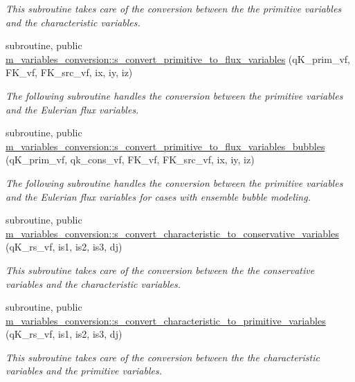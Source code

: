 \begin{DoxyCompactItemize}
\begin{DoxyCompactList}\small\item\em This subroutine takes care of the conversion between the the primitive variables and the characteristic variables. \end{DoxyCompactList}\item 
subroutine, public \hyperlink{namespacem__variables__conversion_a93f1bb8b4aee426f508a6ceef721a35c}{m\+\_\+variables\+\_\+conversion\+::s\+\_\+convert\+\_\+primitive\+\_\+to\+\_\+flux\+\_\+variables} (q\+K\+\_\+prim\+\_\+vf, F\+K\+\_\+vf, F\+K\+\_\+src\+\_\+vf, ix, iy, iz)
\begin{DoxyCompactList}\small\item\em The following subroutine handles the conversion between the primitive variables and the Eulerian flux variables. \end{DoxyCompactList}\item 
subroutine, public \hyperlink{namespacem__variables__conversion_ac02f08709876d8ef71c8f8db47a4efa3}{m\+\_\+variables\+\_\+conversion\+::s\+\_\+convert\+\_\+primitive\+\_\+to\+\_\+flux\+\_\+variables\+\_\+bubbles} (q\+K\+\_\+prim\+\_\+vf, qk\+\_\+cons\+\_\+vf, F\+K\+\_\+vf, F\+K\+\_\+src\+\_\+vf, ix, iy, iz)
\begin{DoxyCompactList}\small\item\em The following subroutine handles the conversion between the primitive variables and the Eulerian flux variables for cases with ensemble bubble modeling. \end{DoxyCompactList}\item 
subroutine, public \hyperlink{namespacem__variables__conversion_a40712fcf8ac2c0e87d0393bbe1a0b800}{m\+\_\+variables\+\_\+conversion\+::s\+\_\+convert\+\_\+characteristic\+\_\+to\+\_\+conservative\+\_\+variables} (q\+K\+\_\+rs\+\_\+vf, is1, is2, is3, dj)
\begin{DoxyCompactList}\small\item\em This subroutine takes care of the conversion between the the conservative variables and the characteristic variables. \end{DoxyCompactList}\item 
subroutine, public \hyperlink{namespacem__variables__conversion_a49df2e65b245cbc006e27663d69e4399}{m\+\_\+variables\+\_\+conversion\+::s\+\_\+convert\+\_\+characteristic\+\_\+to\+\_\+primitive\+\_\+variables} (q\+K\+\_\+rs\+\_\+vf, is1, is2, is3, dj)
\begin{DoxyCompactList}\small\item\em This subroutine takes care of the conversion between the the characteristic variables and the primitive variables. \end{DoxyCompactList}\item 

\end{DoxyCompactItemize}
